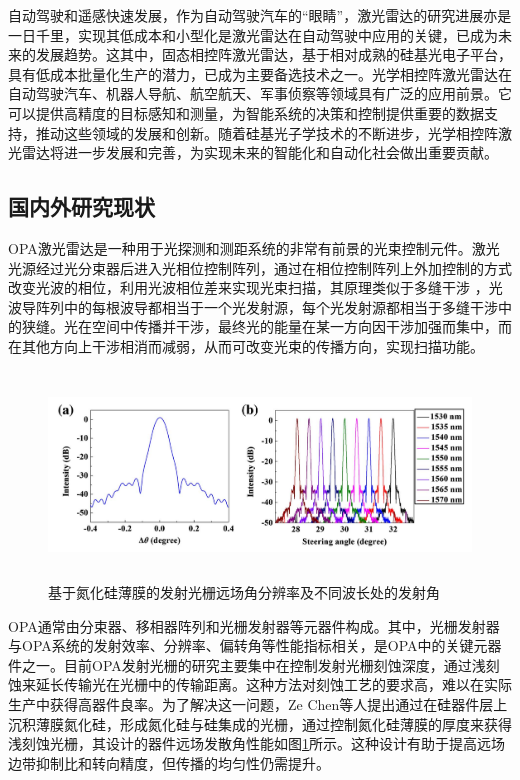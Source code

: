 \documentclass[UTF8,a4paper,12pt]{ctexart}
\numberwithin{equation}{section}
\begin{document}
自动驾驶和遥感快速发展，作为自动驾驶汽车的“眼睛”，激光雷达的研究进展亦是一日千里，实现其低成本和小型化是激光雷达在自动驾驶中应用的关键，已成为未来的发展趋势。这其中，固态相控阵激光雷达，基于相对成熟的硅基光电子平台，具有低成本批量化生产的潜力，已成为主要备选技术之一。光学相控阵激光雷达在自动驾驶汽车、机器人导航、航空航天、军事侦察等领域具有广泛的应用前景。它可以提供高精度的目标感知和测量，为智能系统的决策和控制提供重要的数据支持，推动这些领域的发展和创新。随着硅基光子学技术的不断进步，光学相控阵激光雷达将进一步发展和完善，为实现未来的智能化和自动化社会做出重要贡献。

\subsection{国内外研究现状}
OPA激光雷达是一种用于光探测和测距系统的非常有前景的光束控制元件。激光光源经过光分束器后进入光相位控制阵列，通过在相位控制阵列上外加控制的方式改变光波的相位，利用光波相位差来实现光束扫描，其原理类似于多缝干涉 ，光波导阵列中的每根波导都相当于一个光发射源，每个光发射源都相当于多缝干涉中的狭缝。光在空间中传播并干涉，最终光的能量在某一方向因干涉加强而集中，而在其他方向上干涉相消而减弱，从而可改变光束的传播方向，实现扫描功能。
\begin{figure}[htbp]
\centering %
\includegraphics[height=5.5cm,width=15cm]{fig11.png}
\caption{基于氮化硅薄膜的发射光栅远场角分辨率及不同波长处的发射角}
\label{1-3}
\end{figure}

OPA通常由分束器、移相器阵列和光栅发射器等元器件构成。其中，光栅发射器与OPA系统的发射效率、分辨率、偏转角等性能指标相关，是OPA中的关键元器件之一。目前OPA发射光栅的研究主要集中在控制发射光栅刻蚀深度，通过浅刻蚀来延长传输光在光栅中的传输距离。这种方法对刻蚀工艺的要求高，难以在实际生产中获得高器件良率。为了解决这一问题，Ze Chen等人提出通过在硅器件层上沉积薄膜氮化硅，形成氮化硅与硅集成的光栅，通过控制氮化硅薄膜的厚度来获得浅刻蚀光栅，其设计的器件远场发散角性能如图\ref{1-3}所示。这种设计有助于提高远场边带抑制比和转向精度，但传播的均匀性仍需提升。
\end{document}
